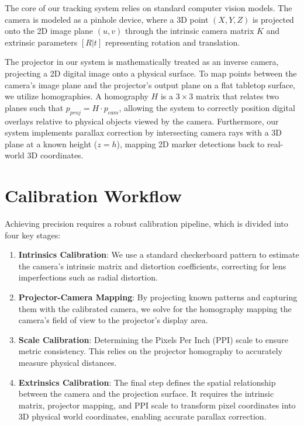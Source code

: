 \documentclass[11pt,a4paper]{article}
\begin{document}
The core of our tracking system relies on standard computer vision models. The camera is modeled as a pinhole device, where a 3D point $(X, Y, Z)$ is projected onto the 2D image plane $(u, v)$ through the intrinsic camera matrix $K$ and extrinsic parameters $[R|t]$ representing rotation and translation.

The projector in our system is mathematically treated as an inverse camera, projecting a 2D digital image onto a physical surface. To map points between the camera's image plane and the projector's output plane on a flat tabletop surface, we utilize homographies. A homography $H$ is a $3 \times 3$ matrix that relates two planes such that $p_{proj} = H \cdot p_{cam}$, allowing the system to correctly position digital overlays relative to physical objects viewed by the camera. Furthermore, our system implements parallax correction by intersecting camera rays with a 3D plane at a known height ($z=h$), mapping 2D marker detections back to real-world 3D coordinates.

\section{Calibration Workflow}

Achieving precision requires a robust calibration pipeline, which is divided into four key stages:
\begin{enumerate}
    \item \textbf{Intrinsics Calibration}: We use a standard checkerboard pattern to estimate the camera's intrinsic matrix and distortion coefficients, correcting for lens imperfections such as radial distortion.
    \item \textbf{Projector-Camera Mapping}: By projecting known patterns and capturing them with the calibrated camera, we solve for the homography mapping the camera's field of view to the projector's display area.
    \item \textbf{Scale Calibration}: Determining the Pixels Per Inch (PPI) scale to ensure metric consistency. This relies on the projector homography to accurately measure physical distances.
    \item \textbf{Extrinsics Calibration}: The final step defines the spatial relationship between the camera and the projection surface. It requires the intrinsic matrix, projector mapping, and PPI scale to transform pixel coordinates into 3D physical world coordinates, enabling accurate parallax correction.
\end{enumerate}
\end{document}
